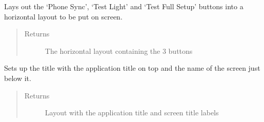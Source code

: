 \documentclass[letterpaper,10pt,english]{sphinxmanual}
\begin{document}
\begin{fulllineitems}
\begin{fulllineitems}
\begin{quote}
\begin{description}
\end{description}\end{quote}

\end{fulllineitems}


\begin{fulllineitems}
\label{\detokenize{index:src.Views.View_VerifySetupScreen.VerifySetupWindow.setButtonLayout}}
Lays out the ‘Phone Sync’, ‘Test Light’ and ‘Test Full Setup’ buttons into a horizontal layout to be
put on screen.
\begin{quote}\begin{description}
\item[{Returns}] \leavevmode
The horizontal layout containing the 3 buttons

\end{description}\end{quote}

\end{fulllineitems}


\begin{fulllineitems}
\label{\detokenize{index:src.Views.View_VerifySetupScreen.VerifySetupWindow.setTitle}}
Sets up the title with the application title on top and the name of the screen just below it.
\begin{quote}\begin{description}
\item[{Returns}] \leavevmode
Layout with the application title and screen title labels

\end{description}\end{quote}

\end{fulllineitems}



\end{fulllineitems}
\end{document}
